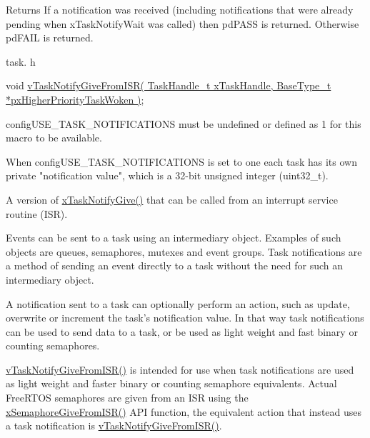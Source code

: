 \begin{DoxyReturn}{Returns}
If a notification was received (including notifications that were already pending when x\-Task\-Notify\-Wait was called) then pd\-P\-A\-S\-S is returned. Otherwise pd\-F\-A\-I\-L is returned.
\end{DoxyReturn}
task. h 
\begin{DoxyPre}void \hyperlink{task_8h_a4a4bcf98ad282a596e13f3f30582a11b}{vTaskNotifyGiveFromISR( TaskHandle\_t xTaskHandle, BaseType\_t *pxHigherPriorityTaskWoken )};\end{DoxyPre}



\begin{DoxyPre}configUSE\_TASK\_NOTIFICATIONS must be undefined or defined as 1 for this macro
to be available.\end{DoxyPre}



\begin{DoxyPre}When configUSE\_TASK\_NOTIFICATIONS is set to one each task has its own private
"notification value", which is a 32-bit unsigned integer (uint32\_t).\end{DoxyPre}



\begin{DoxyPre}A version of \hyperlink{task_8h_ac60cbd05577a3e4f3c3587dd9b213930}{xTaskNotifyGive()} that can be called from an interrupt service
routine (ISR).\end{DoxyPre}



\begin{DoxyPre}Events can be sent to a task using an intermediary object.  Examples of such
objects are queues, semaphores, mutexes and event groups.  Task notifications
are a method of sending an event directly to a task without the need for such
an intermediary object.\end{DoxyPre}



\begin{DoxyPre}A notification sent to a task can optionally perform an action, such as
update, overwrite or increment the task's notification value.  In that way
task notifications can be used to send data to a task, or be used as light
weight and fast binary or counting semaphores.\end{DoxyPre}



\begin{DoxyPre}\hyperlink{task_8h_a4a4bcf98ad282a596e13f3f30582a11b}{vTaskNotifyGiveFromISR()} is intended for use when task notifications are
used as light weight and faster binary or counting semaphore equivalents.
Actual FreeRTOS semaphores are given from an ISR using the
\hyperlink{semphr_8h_a68aa43df8b2a0dbe17d05fad74670ef0}{xSemaphoreGiveFromISR()} API function, the equivalent action that instead uses
a task notification is \hyperlink{task_8h_a4a4bcf98ad282a596e13f3f30582a11b}{vTaskNotifyGiveFromISR()}.\end{DoxyPre}



